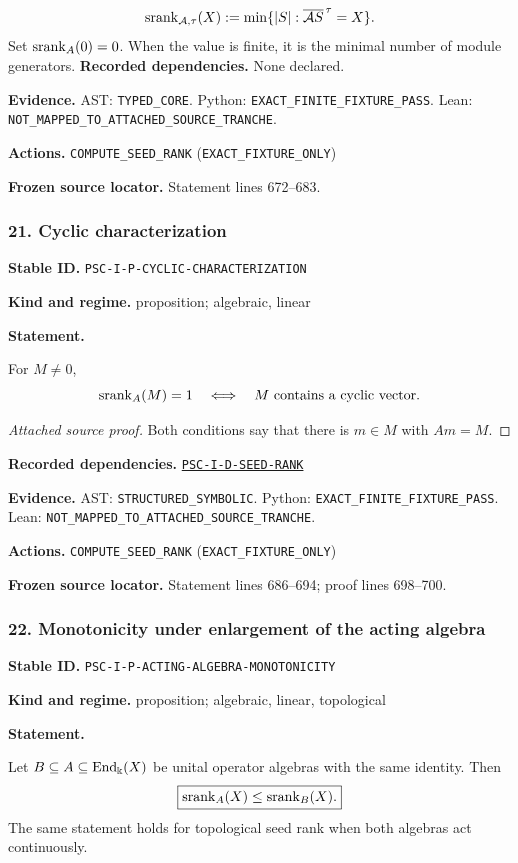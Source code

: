 \documentclass[a4paper,11pt]{article}
\newcommand{\bbk}{\Bbbk}\newcommand{\A}{\mathcal A}\newcommand{\B}{\mathcal B}\newcommand{\Ccal}{\mathcal C}\newcommand{\Pcal}{\mathcal P}\newcommand{\Qcal}{\mathcal Q}\newcommand{\Rcal}{\mathcal R}\newcommand{\Scal}{\mathcal S}
\newcommand{\field}[2]{\noindent\textbf{#1.} #2\par}
\begin{document}
\[
\srank_{\A,\tau}(X):=\min\{|S|:\cl{\A S}^{\,\tau}=X\}.
\]
Set $\operatorname{srank}_A(0)=0$.  When the value is finite, it is the minimal number of module generators.
\field{Recorded dependencies}{None declared.}
\field{Evidence}{AST: \nolinkurl{TYPED_CORE}. Python: \nolinkurl{EXACT_FINITE_FIXTURE_PASS}. Lean: \nolinkurl{NOT_MAPPED_TO_ATTACHED_SOURCE_TRANCHE}.}
\field{Actions}{\nolinkurl{COMPUTE_SEED_RANK} (\nolinkurl{EXACT_FIXTURE_ONLY})}
\field{Frozen source locator}{Statement lines 672--683.}
\subsubsection*{21. Cyclic characterization}
\label{rec:PSC-I-P-CYCLIC-CHARACTERIZATION}
\field{Stable ID}{\nolinkurl{PSC-I-P-CYCLIC-CHARACTERIZATION}}
\field{Kind and regime}{proposition; algebraic, linear}
\textbf{Statement.}\par
For $M\neq0$,
\[
\operatorname{srank}_A(M)=1
\quad\Longleftrightarrow\quad
M\text{ contains a cyclic vector}.
\]

\begin{proof}[Attached source proof]
Both conditions say that there is $m\in M$ with $Am=M$.
\end{proof}
\field{Recorded dependencies}{\hyperref[rec:PSC-I-D-SEED-RANK]{\nolinkurl{PSC-I-D-SEED-RANK}}}
\field{Evidence}{AST: \nolinkurl{STRUCTURED_SYMBOLIC}. Python: \nolinkurl{EXACT_FINITE_FIXTURE_PASS}. Lean: \nolinkurl{NOT_MAPPED_TO_ATTACHED_SOURCE_TRANCHE}.}
\field{Actions}{\nolinkurl{COMPUTE_SEED_RANK} (\nolinkurl{EXACT_FIXTURE_ONLY})}
\field{Frozen source locator}{Statement lines 686--694; proof lines 698--700.}
\subsubsection*{22. Monotonicity under enlargement of the acting algebra}
\label{rec:PSC-I-P-ACTING-ALGEBRA-MONOTONICITY}
\field{Stable ID}{\nolinkurl{PSC-I-P-ACTING-ALGEBRA-MONOTONICITY}}
\field{Kind and regime}{proposition; algebraic, linear, topological}
\textbf{Statement.}\par
Let $B\subseteq A\subseteq\End_{\bbk}(X)$ be unital operator algebras with the same identity.  Then
\[
\boxed{\operatorname{srank}_A(X)\leq\operatorname{srank}_B(X).}
\]
The same statement holds for topological seed rank when both algebras act continuously.
\end{document}
